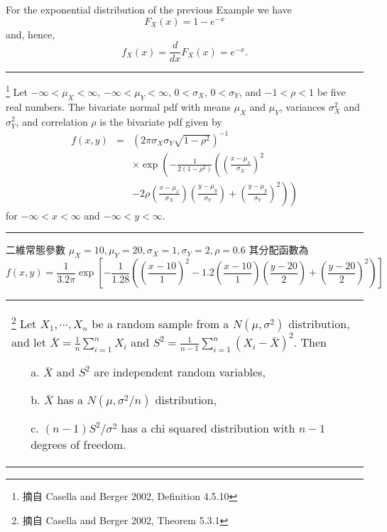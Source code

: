 \begin{ex} %
{\C For the exponential distribution of the previous Example we have}
\[F_X(x)=1-e^{-x}\]
{\C and, hence,}
\[f_X(x)=\frac{d}{dx}F_X(x)=e^{-x}.\]
\end{ex}
\bigskip

\noindent \rule{\textwidth}{0.2pt}
\begin{de}\footnote{摘自 {\C Casella and Berger 2002, Definition 4.5.10}}   %
{\C Let $-\infty<\mu_X<\infty$, $-\infty<\mu_Y<\infty$, $0<\sigma_X$, $0<\sigma_Y$, and
$-1<\rho<1$ be five real numbers.  The bivariate normal pdf with means $\mu_X$ and $\mu_Y$,
variances $\sigma_X^2$ and $\sigma_Y^2$, and correlation $\rho$ is the bivariate pdf given by}
\begin{eqnarray*}
f(x,y)&=&\left( 2\pi\sigma_X\sigma_Y\sqrt{1-\rho^2}\right)^{-1}\\
      && \times\exp\left(-\frac{1}{2(1-\rho^2)}\left(\left(\frac{x-\mu_x}{\sigma_X}\right)^2\right.\right.\\
      && \left.\left.-2\rho\left(\frac{x-\mu_x}{\sigma_X}\right)\left(\frac{y-\mu_y}{\sigma_Y}\right)
      +\left(\frac{y-\mu_y}{\sigma_Y}\right)^2 \right)\right)
\end{eqnarray*}
for $-\infty<x<\infty$ and $-\infty<y<\infty$.\\
\noindent \rule{\textwidth}{0.2pt}
\end{de}

\begin{ex} %
二維常態參數 $\mu_X=10, \mu_Y=20, \sigma_X=1, \sigma_Y=2, \rho=0.6$ 其分配函數為
\begin{equation*}
f(x,y)=\frac{1}{3.2\pi}\exp\left[-\frac{1}{1.28}\left((\frac{x-10}{1})^2
       -1.2(\frac{x-10}{1})(\frac{y-20}{2})+(\frac{y-20}{2})^2 \right)\right]
\end{equation*}
\end{ex}
\bigskip
\begin{center}\colorbox{slight}{\begin{tabular}{p{}}
\begin{thm}\label{demo_ref}\footnote{摘自 {\C Casella and Berger 2002, Theorem 5.3.1}} %
{\C Let $X_1, \cdots, X_n$ be a random sample from a $N(\mu, \sigma^2)$ distribution, and let
$\bar{X}=\frac{1}{n}\sum_{i=1}^n X_i$ and $S^2=\frac{1}{n-1}\sum_{i=1}^n (X_i-\bar{X})^2$.  Then}
\begin{itemize}
\item[a.] {\C $\bar{X}$ and $S^2$ are independent random variables,}
\item[b.] {\C $\bar{X}$ has a $N(\mu, \sigma^2/n)$ distribution,}
\item[c.] {\C $(n-1)S^2/\sigma^2$ has a chi squared distribution with $n-1$ degrees of freedom.}
\end{itemize}
\end{thm}
 \end{tabular}}\end{center}
\bigskip

